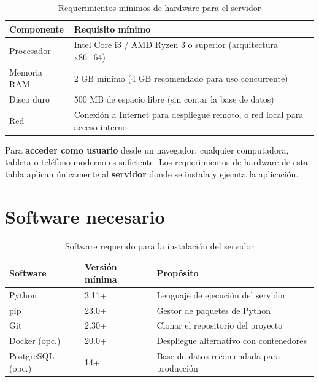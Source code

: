 \documentclass[10pt,letterpaper]{report}
\begin{document}
\begin{table}[H]
  \centering
  \caption{Requerimientos mínimos de hardware para el servidor}
  \label{tab:hw-minimo}
  \begin{tabularx}{\textwidth}{l X}
    \toprule
    \textbf{Componente} & \textbf{Requisito mínimo} \\
    \midrule
    Procesador   & Intel Core i3 / AMD Ryzen 3 o superior (arquitectura x86\_64) \\
    Memoria RAM  & 2 GB mínimo (4 GB recomendado para uso concurrente) \\
    Disco duro   & 500 MB de espacio libre (sin contar la base de datos) \\
    Red          & Conexión a Internet para despliegue remoto, o red local para acceso interno \\
    \bottomrule
  \end{tabularx}
\end{table}

\begin{infobox}
  Para \textbf{acceder como usuario} desde un navegador, cualquier computadora, tableta o teléfono moderno es suficiente. Los requerimientos de hardware de esta tabla aplican únicamente al \textbf{servidor} donde se instala y ejecuta la aplicación.
\end{infobox}

\section{Software necesario}

\begin{table}[H]
  \centering
  \caption{Software requerido para la instalación del servidor}
  \label{tab:sw-necesario}
  \begin{tabularx}{\textwidth}{l l X}
    \toprule
    \textbf{Software} & \textbf{Versión mínima} & \textbf{Propósito} \\
    \midrule
    Python          & 3.11+  & Lenguaje de ejecución del servidor \\
    pip             & 23.0+  & Gestor de paquetes de Python \\
    Git             & 2.30+  & Clonar el repositorio del proyecto \\
    Docker (opc.)   & 20.0+  & Despliegue alternativo con contenedores \\
    PostgreSQL (opc.) & 14+ & Base de datos recomendada para producción \\
    \bottomrule
  \end{tabularx}
\end{table}
\end{document}
